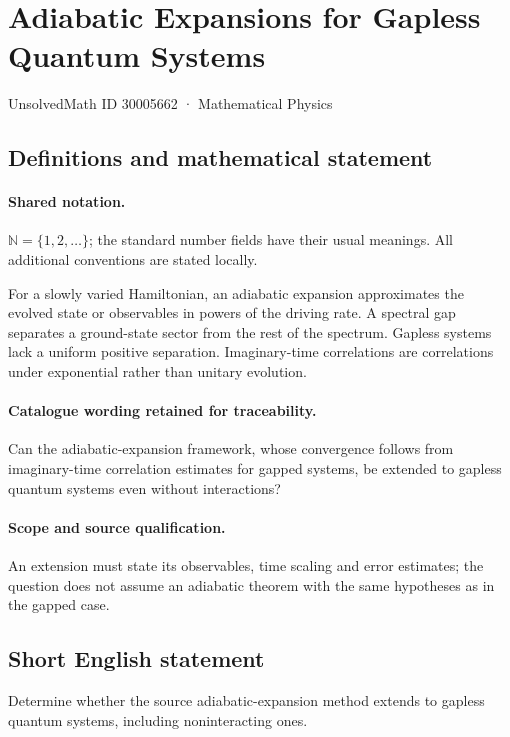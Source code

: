 \documentclass[11pt]{article}
\begin{document}
\setcounter{section}{30005661}
\section{Adiabatic Expansions for Gapless Quantum Systems}\label{30005662}
{\small UnsolvedMath ID 30005662 · Mathematical Physics}
\subsection{Definitions and mathematical statement}

\paragraph{Shared notation.}$\mathbb N=\{1,2,\ldots\}$; the standard number fields have their usual meanings. All additional conventions are stated locally.


For a slowly varied Hamiltonian, an adiabatic expansion approximates the evolved state or observables in powers of the driving rate. A spectral gap separates a ground-state sector from the rest of the spectrum. Gapless systems lack a uniform positive separation. Imaginary-time correlations are correlations under exponential rather than unitary evolution.

\paragraph{Catalogue wording retained for traceability.}
Can the adiabatic-expansion framework, whose convergence follows from imaginary-time correlation estimates for gapped systems, be extended to gapless quantum systems even without interactions?

\paragraph{Scope and source qualification.}An extension must state its observables, time scaling and error estimates; the question does not assume an adiabatic theorem with the same hypotheses as in the gapped case.
\subsection{Short English statement}
Determine whether the source adiabatic-expansion method extends to gapless quantum systems, including noninteracting ones.
\end{document}
